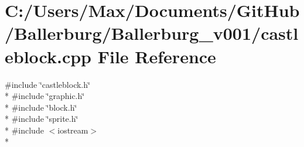 \section{C\+:/\+Users/\+Max/\+Documents/\+Git\+Hub/\+Ballerburg/\+Ballerburg\+\_\+v001/castleblock.cpp File Reference}
\label{castleblock_8cpp}
{\ttfamily \#include \char`\"{}castleblock.\+h\char`\"{}}\\*
{\ttfamily \#include \char`\"{}graphic.\+h\char`\"{}}\\*
{\ttfamily \#include \char`\"{}block.\+h\char`\"{}}\\*
{\ttfamily \#include \char`\"{}sprite.\+h\char`\"{}}\\*
{\ttfamily \#include $<$iostream$>$}\\*
